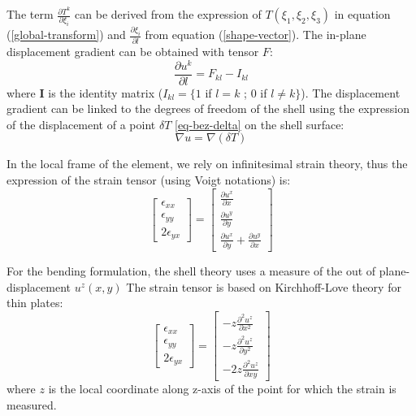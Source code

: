 \documentclass{egpubl}
\newcommand{\deriv}[2]{\frac{\partial #1}{\partial #2}}
\newcommand{\mat}[1]{\mathbf{#1}}
\begin{document}
The term $\deriv{T^k}{\xi_i}$ can be derived from the expression of $T(\xi_1,\xi_2, \xi_3)$ in equation (\ref{global-transform}) and 
$\deriv{\xi_i}{l}$ from equation (\ref{shape-vector}). 
The in-plane displacement gradient can be obtained with tensor $F$:
%
\begin{equation}
\deriv{u^k}{l} = F_{kl} - I_{kl} 
\end{equation}
%
where $\mat{I}$ is the identity matrix ($I_{kl}  = \{1$ if $l=k$ ;  $0$ if $l \neq k \} $). 
The displacement gradient can be linked to the degrees of freedom of the shell using the expression of the displacement of a point $\delta T$ \eqref{eq-bez-delta} on the shell surface:
\begin{equation}
    \nabla u = \nabla(\delta T)
\end{equation}

In the local frame of the element, we rely on infinitesimal strain theory, thus the expression of the strain tensor (using Voigt notations) is:
\begin{equation}\label{eq-in-plane-strain}
    \begin{bmatrix}
        \epsilon_{xx} \\ \epsilon_{yy} \\ 2\epsilon_{yx}
    \end{bmatrix}
    = 
    \begin{bmatrix}
        \deriv{u^x}{x}  \\[1mm]  \deriv{u^y}{y}  \\[1mm]  \deriv{u^x}{y} + \deriv{u^y}{x}
    \end{bmatrix}
\end{equation}

For the bending formulation, the shell theory uses a measure of the out of plane-displacement $u^z(x,y)$
The strain tensor is based on Kirchhoff-Love theory for thin plates:
\begin{equation}\label{out-plane-strain}
    \begin{bmatrix}
        \epsilon_{xx} \\ \epsilon_{yy} \\ 2\epsilon_{yx}
    \end{bmatrix}
    =
    \begin{bmatrix}
        -z \deriv{^2 u^z}{x^2}  \\[1mm]  -z \deriv{^2 u^z}{y^2}  \\[1mm]  - 2z \deriv{^2 u^z}{xy}
    \end{bmatrix}
\end{equation}
where $z$ is the local coordinate along z-axis of the point for which the strain is measured.
\end{document}
